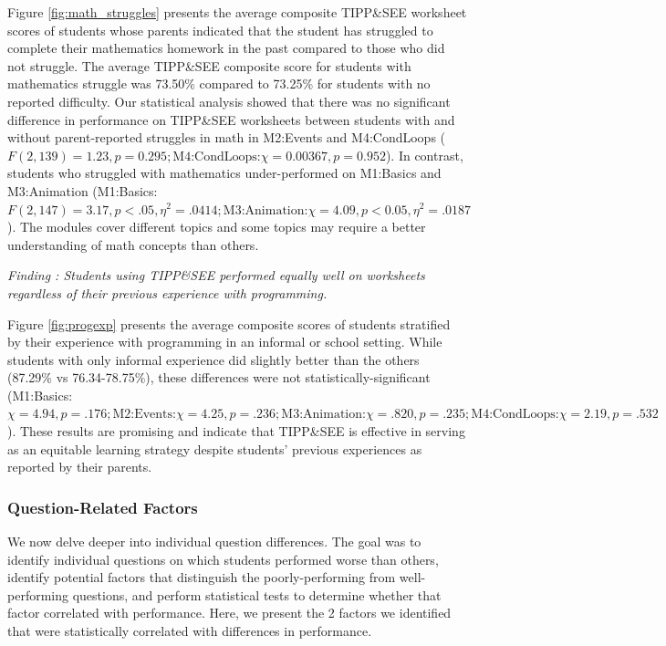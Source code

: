 \documentclass[sigconf,manuscript,review,anonymous]{acmart} %
\def\ts{TIPP\&SEE}
\begin{document}
Figure \ref{fig:math_struggles} presents the average composite \ts{} worksheet scores of students whose parents indicated that the student has struggled to complete their mathematics homework in the past compared to those who did not struggle. The average \ts{} composite score for students with mathematics struggle was 73.50\% compared to 73.25\% for students with no reported difficulty. Our statistical analysis showed that there was no significant difference in performance on \ts{} worksheets between students with and without parent-reported struggles in math in M2:Events and M4:CondLoops (\begin{math} F(2,139)=1.23, p=0.295; \text{M4:CondLoops:} \chi=0.00367, p=0.952\end{math}). In contrast, students who struggled with mathematics under-performed on M1:Basics and M3:Animation (M1:Basics:\begin{math} F(2, 147)=3.17, p<.05, \eta^2=.0414; \text{M3:Animation:} \chi=4.09, p<0.05, \eta^2=.0187\end{math}). The modules cover different topics and some topics may require a better understanding of math concepts than others.

 \textit{Finding : Students using \ts{} performed equally well on worksheets regardless of their previous experience with programming.}

Figure \ref{fig:progexp} presents the average composite scores of students stratified by their experience with programming in an informal or school setting. While students with only informal experience did slightly better than the others (87.29\% vs 76.34-78.75\%), these differences were not statistically-significant (M1:Basics:\begin{math} \chi=4.94, p=.176; \text{M2:Events:} \chi=4.25, p=.236; \text{M3:Animation:} \chi=.820, p=.235; \text{M4:CondLoops:} \chi=2.19, p=.532\end{math}). These results are promising and indicate that \ts{} is effective in serving as an equitable learning strategy despite students' previous experiences as reported by their parents.

\subsubsection{Question-Related Factors} 
We now delve deeper into individual question differences. The goal was to identify individual questions on which students performed worse than others, identify potential factors that distinguish the poorly-performing from well-performing questions, and perform statistical tests to determine whether that factor correlated with performance. Here, we present the 2 factors we identified that were statistically correlated with differences in performance.
\end{document}
